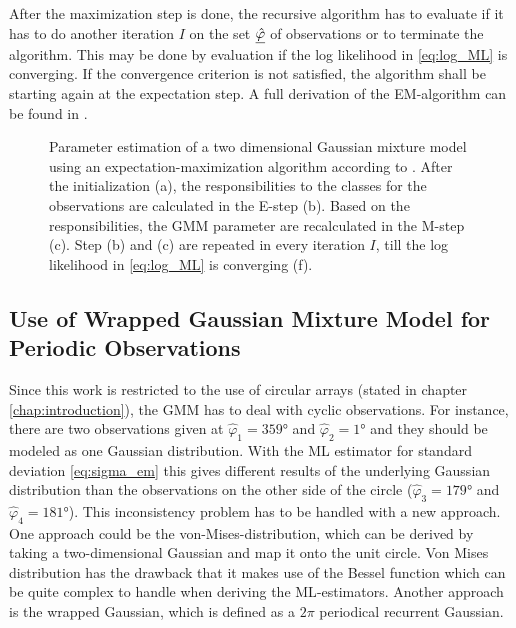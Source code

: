 After the maximization step is done, the recursive algorithm has to evaluate if it has to do another iteration $I$ on the set $\underline{\hat{\varphi}}$ of observations or to terminate the algorithm. This may be done by evaluation if the log likelihood in \ref{eq:log_ML} is converging. If the convergence criterion is not satisfied, the algorithm shall be starting again at the expectation step. A full derivation of the \ac{EM}-algorithm can be found in \cite[Chapter~9.2]{bishop2016pattern}.

\begin{figure}[!ht]
	\centering
		  \def\svgwidth{1\linewidth}
		  \scriptsize
	\caption{Parameter estimation of a two dimensional Gaussian mixture model using an expectation-maximization algorithm according to \cite[Chapter~9.2.2]{bishop2016pattern}. After the initialization (a), the responsibilities to the classes for the observations are calculated in the E-step (b). Based on the responsibilities, the \acl{GMM} parameter are recalculated in the M-step (c). Step (b) and (c) are repeated in every iteration $I$, till the log likelihood in \ref{eq:log_ML} is converging (f).}
	\label{fig:EM}
\end{figure}

\subsection{Use of Wrapped Gaussian Mixture Model for Periodic Observations}
\label{subsec:wgmm}
Since this work is restricted to the use of circular arrays
(stated in chapter \ref{chap:introduction}), the \ac{GMM} has to deal with cyclic observations. For instance, there are two observations given at $\hat{\varphi}_1 = \ang{359}$ and  $\hat{\varphi}_2 = \ang{1}$ and they should be modeled as one Gaussian distribution. With the \ac{ML} estimator for standard deviation \ref{eq:sigma_em} this gives different results of the underlying Gaussian distribution than the observations on the other side of the circle ($\hat{\varphi}_3 = \ang{179}$ and $\hat{\varphi}_4 = \ang{181}$). This inconsistency problem has to be handled with a new approach. One approach could be the von-Mises-distribution, which can be derived by taking a two-dimensional Gaussian and map it onto the unit circle. Von Mises distribution has the drawback that it makes use of the Bessel function which can be quite complex to handle when deriving the \ac{ML}-estimators. Another approach is the wrapped Gaussian, which is defined as a $2\pi$ periodical recurrent Gaussian.

